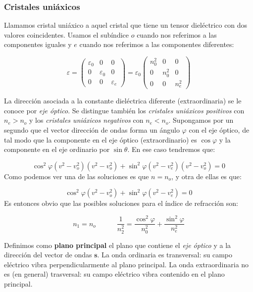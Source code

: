 \documentclass[12pt,a4paper]{article}
\newcommand{\tquad}{\quad \quad \quad}
\newcommand{\sn}{\mathbf{s}}
\numberwithin{equation}{section}
\numberwithin{figure}{section}
\begin{document}
\subsubsection{Cristales uniáxicos}

Llamamos cristal uniáxico a aquel cristal que tiene un tensor dieléctrico  con dos valores coincidentes. Usamos el subíndice $o$ cuando nos referimos a las componentes iguales y $e$ cuando nos referimos a las componentes diferentes:

\begin{equation}
\varepsilon = \begin{pmatrix}
\varepsilon_0 & 0 & 0 \\
0 & \varepsilon_0 & 0 \\
0 & 0 & \varepsilon_e
\end{pmatrix} = \varepsilon_0 
\begin{pmatrix}
n^2_0 & 0 & 0 \\
0 & n^2_0 & 0 \\
0 & 0 & n^2_e 
\end{pmatrix}
\end{equation}

La dirección asociada a la constante dieléctrica diferente (extraordinaria) se le conoce por \textit{eje óptico}. Se distingue también los \textit{cristales uniáxicos positivos} con $n_e>n_o$ y los \textit{cristales uniáxicos negativos} con $n_e<n_o$. Supongamos por un segundo que el vector dirección de ondas forma un ángulo $\varphi$ con el eje óptico, de tal modo que la componente en el eje óptico (extraordinario) es $\cos \varphi$ y la componente en el eje ordinario por $\sin \theta$. En ese caso tendremos que:

\begin{equation}
\cos^2 \varphi (v^2 - v_o^2)(v^2-v_o^2)+ \sin^2 \varphi (v^2 - v_e^2)(v^2-v_o^2) = 0
\end{equation}
Como podemos ver una de las soluciones es que $n=n_o$, y otra de ellas es que:

$$ \cos^2 \varphi (v^2 - v_o^2)+ \sin ^2\varphi (v^2 - v_e^2) = 0 $$
Es entonces obvio que las posibles soluciones para el índice de refracción son:

\begin{equation}
n_1 = n_o \tquad \dfrac{1}{n_2^2} = \dfrac{\cos^2 \varphi}{n_0^2} + \dfrac{\sin^2 \varphi}{n_e^2} \label{Ec:10.2.4.15}
\end{equation}

Definimos como \textbf{plano principal} el plano que contiene el \textit{eje óptico} y a la dirección del vector de ondas $\sn$. La onda ordinaria es transversal: su campo eléctrico vibra perpendicularmente al plano principal. La onda extraordinaria no es (en general) trasversal: su campo eléctrico vibra contenido en el plano principal.
\end{document}
